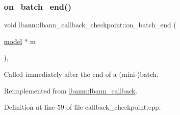 \mbox{\label{classlbann_1_1lbann__callback__checkpoint_a476527e2b7b44dd3623e01f63ddb5f78}} 
\subsubsection{\texorpdfstring{on\+\_\+batch\+\_\+end()}{on\_batch\_end()}}
{\footnotesize\ttfamily void lbann\+::lbann\+\_\+callback\+\_\+checkpoint\+::on\+\_\+batch\+\_\+end (\begin{DoxyParamCaption}\item[{\hyperlink{classlbann_1_1model}{model} $\ast$}]{m }\end{DoxyParamCaption})\hspace{0.3cm}{\ttfamily [override]}, {\ttfamily [virtual]}}

Called immediately after the end of a (mini-\/)batch. 

Reimplemented from \hyperlink{classlbann_1_1lbann__callback_a895ca577e358601fcae5c04749f60535}{lbann\+::lbann\+\_\+callback}.



Definition at line 59 of file callback\+\_\+checkpoint.\+cpp.


